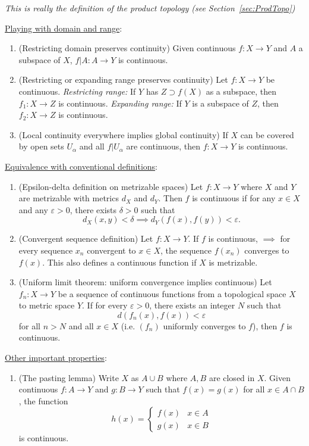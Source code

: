 \documentclass[letterpaper, 12pt]{article}
\newcommand{\eps}{\varepsilon}
\begin{document}
\begin{enumerate}[resume]
\begin{enumerate}
    \textit{This is really the definition of the product topology (see Section~\ref{sec:ProdTopo})}
    \end{enumerate}
    \underline{Playing with domain and range}:
    \begin{enumerate}[resume]
    \item (Restricting domain preserves continuity) Given continuous $f:X\to Y$ and $A$ a subspace of $X$, $f|A : A\to Y$ is continuous.
    \item (Restricting or expanding range preserves continuity) Let $f:X\to Y$ be continuous. \textit{Restricting range:} If $Y$ has $Z \supset f(X)$ as a subspace, then $f_1: X\to Z$ is continuous. \textit{Expanding range:} If $Y$ is a subspace of $Z$, then $f_2:X\to Z$ is continuous.

    \item (Local continuity everywhere implies global continuity) If $X$ can be covered by open sets $U_\alpha$ and all $f|U_\alpha$ are continuous, then $f:X\to Y$ is continuous.
    \end{enumerate}
    \underline{Equivalence with conventional definitions}:
    \begin{enumerate}[resume]
    \item (Epsilon-delta definition on metrizable spaces) Let $f:X\to Y$ where $X$ and $Y$ are metrizable with metrics $d_X$ and $d_Y$. Then $f$ is continuous if for any $x\in X$ and any $\eps > 0$, there exists $\delta > 0$ such that \[d_X(x, y) < \delta \implies d_Y(f(x), f(y)) < \eps.\]
    \item (Convergent sequence definition) Let $f:X\to Y$. If $f$ is continuous, $\implies$ for every sequence $x_n$ convergent to $x\in X$, the sequence $f(x_n)$ converges to $f(x)$. This also defines a continuous function if $X$ is metrizable.
    \item (Uniform limit theorem: uniform convergence implies continuous) Let $f_n : X\to Y$ be a sequence of continuous functions from a topological space $X$ to metric space $Y$. If for every $\eps> 0$, there exists an integer $N$ such that \[d(f_n(x), f(x)) < \eps\] for all $n>N$ and all $x\in X$ (i.e. $(f_n)$ uniformly converges to $f$), then $f$ is continuous.
    \end{enumerate}
    \underline{Other important properties}:
    \begin{enumerate}[resume]
    \item (The pasting lemma) Write $X$ as $A\cup B$ where $A, B$ are closed in $X$. Given continuous $f:A\to Y$ and $g:B\to Y$ such that $f(x) = g(x)$ for all $x\in A \cap B$, the function \[h(x) = \begin{cases}f(x) & x\in A \\ g(x) & x\in B\end{cases}\] is continuous.

\end{enumerate}
\end{enumerate}
\end{document}
